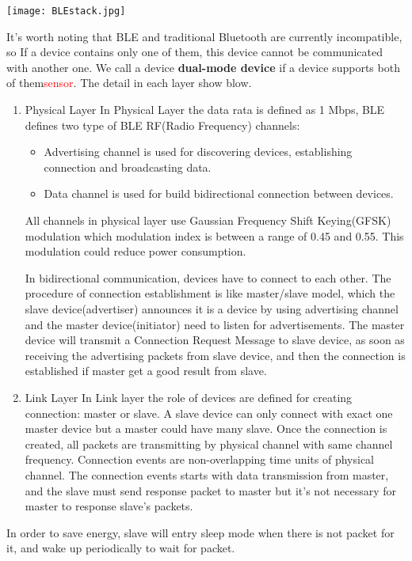 \documentclass{report}
\begin{document}
\texttt{[image: BLEstack.jpg]}

It's worth noting that BLE and traditional Bluetooth are currently incompatible, so If a device contains only one of them, this device cannot be communicated with another one. We call a device \textbf{dual-mode device} if a device supports both of them\textcolor{red}{sensor}. The detail in each layer show blow.

\begin{enumerate}
    \item Physical Layer
        In Physical Layer the data rata is defined as 1 Mbps, BLE defines two type of BLE RF(Radio Frequency) channels: 
        \begin{itemize}
            \item Advertising channel is used for discovering devices, establishing connection and broadcasting data. 
            \item Data channel is used for build bidirectional connection between devices.
        \end{itemize}
        All channels in physical layer use Gaussian Frequency Shift Keying(GFSK) modulation which modulation index is between a range of 0.45 and 0.55. This modulation could reduce power consumption.
        
        In bidirectional communication, devices have to connect to each other. The procedure of connection establishment is like master/slave model, which the slave device(advertiser) announces it is a device by using advertising channel and the master device(initiator) need to listen for advertisements. The master device will transmit a Connection Request Message to slave device, as soon as receiving the advertising packets from slave device, and then the connection is established if master get a good result from slave. 
        
    \item Link Layer
        In Link layer the role of devices are defined for creating connection: master or slave. A slave device can only connect with exact one master device but a master could have many slave.
        Once the connection is created, all packets are transmitting by physical channel with same channel frequency. Connection events are non-overlapping time units of physical channel. The connection events starts with data transmission from master, and the slave must send response packet to master but it's not necessary for master to response slave's packets.
\end{enumerate}    
    In order to save energy, slave will entry sleep mode when there is not packet for it, and wake up periodically to wait for packet.
    
\end{document}
